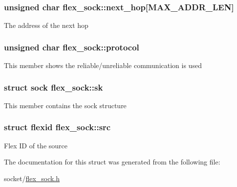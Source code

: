 \subsubsection[{\texorpdfstring{next\+\_\+hop}{next_hop}}]{\setlength{\rightskip}{0pt plus 5cm}unsigned char flex\+\_\+sock\+::next\+\_\+hop\mbox{[}M\+A\+X\+\_\+\+A\+D\+D\+R\+\_\+\+L\+EN\mbox{]}}\hypertarget{structflex__sock_a7c9d43f00ac325627f1396ffc10fe74a}{}\label{structflex__sock_a7c9d43f00ac325627f1396ffc10fe74a}
The address of the next hop 
\subsubsection[{\texorpdfstring{protocol}{protocol}}]{\setlength{\rightskip}{0pt plus 5cm}unsigned char flex\+\_\+sock\+::protocol}\hypertarget{structflex__sock_acea083a0cc7f13d3491228dd261bfc70}{}\label{structflex__sock_acea083a0cc7f13d3491228dd261bfc70}
This member shows the reliable/unreliable communication is used 
\subsubsection[{\texorpdfstring{sk}{sk}}]{\setlength{\rightskip}{0pt plus 5cm}struct sock flex\+\_\+sock\+::sk}\hypertarget{structflex__sock_a1ffc5042c0d6dd6b651ecb6a8e9b1096}{}\label{structflex__sock_a1ffc5042c0d6dd6b651ecb6a8e9b1096}
This member contains the sock structure 
\subsubsection[{\texorpdfstring{src}{src}}]{\setlength{\rightskip}{0pt plus 5cm}struct {\bf flexid} flex\+\_\+sock\+::src}\hypertarget{structflex__sock_a132b613c5f785e07196306bff98ef85d}{}\label{structflex__sock_a132b613c5f785e07196306bff98ef85d}
Flex ID of the source 

The documentation for this struct was generated from the following file\+:\begin{DoxyCompactItemize}
\item 
socket/\hyperlink{flex__sock_8h}{flex\+\_\+sock.\+h}\end{DoxyCompactItemize}
